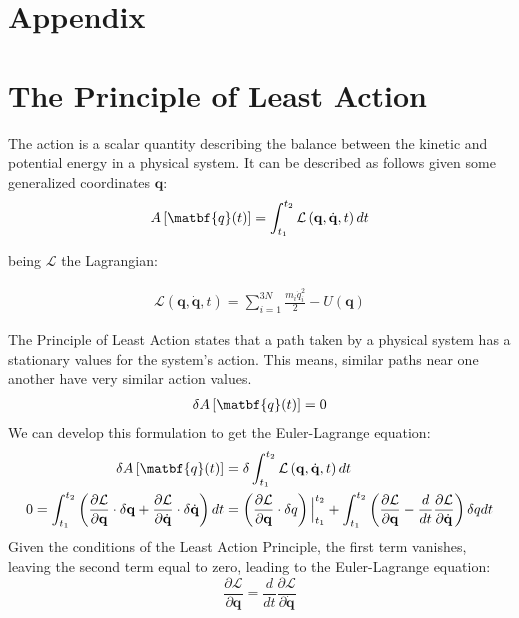\documentclass[draft]{agujournal2019}
\begin{document}
\section{Appendix}
\appendix
\section{The Principle of Least Action}
\begin{definition}
    The action is a scalar quantity describing the balance between the kinetic and potential energy in a physical system. It can be described as follows given some generalized coordinates $\mathbf{q}$:
    \begin{align*}
        A\left[ \matbf{q}(t) \right] = \int_{t_1}^{t_2} \mathcal{L}\left(\mathbf{q}, \dot{\mathbf{q}}, t\right) dt
    \end{align*}
\end{definition}

being $\mathcal{L}$ the Lagrangian:

\begin{align*}
    \mathcal{L} \left(\mathbf{q}, \dot{\mathbf{q}}, t \right) = \sum_{i = 1}^{3N} \frac{m_i \dot{q}_i^2}{2} - U(\mathbf{q})
\end{align*}

\begin{definition}
    The Principle of Least Action states that a path taken by a physical system has a stationary values for the system's action. This means, similar paths near one another have very similar action values.
    \begin{align*}
        \delta A\left[ \matbf{q}(t) \right] = 0
    \end{align*}
    We can develop this formulation to get the Euler-Lagrange equation:
    \begin{align*}
        \delta A\left[ \matbf{q}(t) \right] &= \delta \int_{t_1}^{t_2} \mathcal{L}\left(\mathbf{q}, \dot{\mathbf{q}}, t\right) dt \\
        0 = \int_{t_1}^{t_2} \left( \frac{\partial \mathcal{L}}{\partial \mathbf{q}} \cdot \delta \mathbf{q} + \frac{\partial \mathcal{L}}{\partial \dot{\mathbf{q}}} \cdot \delta \dot{\mathbf{q}} \right)dt &= \left( \frac{\partial \mathcal{L}}{\partial \mathbf{q}} \cdot \delta q \right) \Big|_{t_1}^{t_2} + \int_{t_1}^{t_2} \left( \frac{\partial \mathcal{L}}{\partial \mathbf{q}} - \frac{d}{dt} \frac{\partial \mathcal{L}}{\partial \dot{\mathbf{q}}}  \right) \delta q dt
    \end{align*}
    Given the conditions of the Least Action Principle, the first term vanishes, leaving the second term equal to zero, leading to the Euler-Lagrange equation:
    \begin{equation}
        \frac{\partial \mathcal{L}}{\partial \mathbf{q}} = \frac{d}{dt} \frac{\partial \mathcal{L}}{\partial \dot{\mathbf{q}}}
    \end{equation}
\end{definition}
\end{document}
